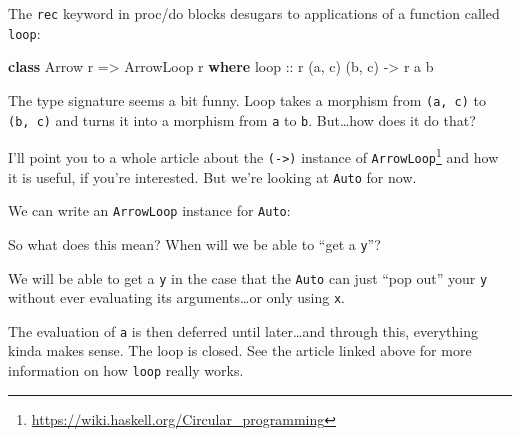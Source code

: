 \documentclass[]{article}
\newenvironment{Shaded}{}{}
\newcommand{\CommentTok}[1]{\textcolor[rgb]{0.38,0.63,0.69}{\textit{#1}}}
\newcommand{\DataTypeTok}[1]{\textcolor[rgb]{0.56,0.13,0.00}{#1}}
\newcommand{\KeywordTok}[1]{\textcolor[rgb]{0.00,0.44,0.13}{\textbf{#1}}}
\newcommand{\NormalTok}[1]{#1}
\newcommand{\OperatorTok}[1]{\textcolor[rgb]{0.40,0.40,0.40}{#1}}
\newcommand{\OtherTok}[1]{\textcolor[rgb]{0.00,0.44,0.13}{#1}}
\renewcommand{\href}[2]{#2\footnote{\url{#1}}}
\begin{document}
The \texttt{rec} keyword in proc/do blocks desugars to applications of a
function called \texttt{loop}:

\begin{Shaded}
\begin{Highlighting}[]
\KeywordTok{class} \DataTypeTok{Arrow}\NormalTok{ r }\OtherTok{=>} \DataTypeTok{ArrowLoop}\NormalTok{ r }\KeywordTok{where}
\OtherTok{    loop ::}\NormalTok{ r (a, c) (b, c) }\OtherTok{{-}>}\NormalTok{ r a b}
\end{Highlighting}
\end{Shaded}

The type signature seems a bit funny. Loop takes a morphism from
\texttt{(a,\ c)} to \texttt{(b,\ c)} and turns it into a morphism from
\texttt{a} to \texttt{b}. But\ldots how does it do that?

I'll point you to \href{https://wiki.haskell.org/Circular_programming}{a whole
article about the \texttt{(-\textgreater{})} instance of \texttt{ArrowLoop}} and
how it is useful, if you're interested. But we're looking at \texttt{Auto} for
now.

We can write an \texttt{ArrowLoop} instance for \texttt{Auto}:

\begin{Shaded}
\end{Shaded}

So what does this mean? When will we be able to ``get a \texttt{y}''?

We will be able to get a \texttt{y} in the case that the \texttt{Auto} can just
``pop out'' your \texttt{y} without ever evaluating its arguments\ldots or only
using \texttt{x}.

The evaluation of \texttt{a\textquotesingle{}} is then deferred until
later\ldots and through this, everything kinda makes sense. The loop is closed.
See the article linked above for more information on how \texttt{loop} really
works.
\end{document}
